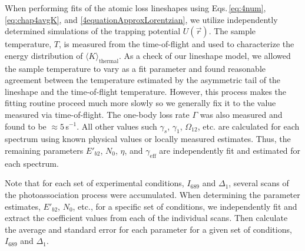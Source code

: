 When performing fits of the atomic loss lineshapes using Eqs.\,\ref{eq:4num}, \ref{eq:chap4avgK}, and \ref{4equationApproxLorentzian}, we utilize independently determined simulations of the trapping potential $U(\vec{r})$.
The sample temperature, $T$, is measured from the time-of-flight and used to characterize the energy distribution of $\langle K \rangle_\text{thermal}$.
As a check of our lineshape model, we allowed the sample temperature to vary as a fit parameter and found reasonable agreement between the temperature estimated by the asymmetric tail of the lineshape and the time-of-flight temperature.
However, this process makes the fitting routine proceed much more slowly so we generally fix it to the value measured via time-of-flight.
The one-body loss rate $\Gamma$ was also measured and found to be $\approx\!5$\,s$^{-1}$.
All other values such $\gamma_s$, $\gamma_1$, $\Omega_{12}$, etc. are calculated for each spectrum using known physical values or locally measured estimates.
Thus, the remaining parameters $E'_{b2}$, $N_0$, $\eta$, and $\gamma_{\text{eff}}$ are independently fit and estimated for each spectrum.

Note that for each set of experimental conditions, $I_{689}$ and $\Delta_1$, several scans of the photoassociation process were accumulated. 
When determining the parameter estimates, $E'_{b2}$, $N_0$, etc., for a specific set of conditions, we independently fit and extract the coefficient values from each of the individual scans.
Then calculate the average and standard error for each parameter for a given set of conditions, $I_{689}$ and $\Delta_1$.


